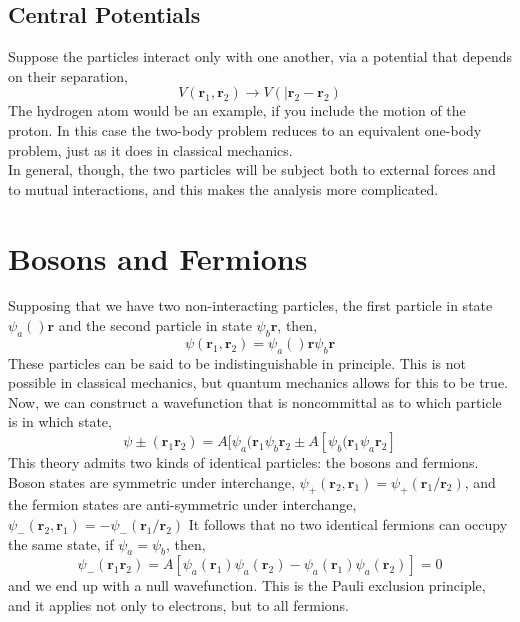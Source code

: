 \subsection{Central Potentials}
Suppose the particles interact only with one another, via a potential that depends on their separation,
\begin{equation}
    V(\textbf{r}_1,\textbf{r}_2)\longrightarrow V(|\textbf{r}_2-\textbf{r}_2)
\end{equation}
The hydrogen atom would be an example, if you include the motion of the proton. In this case the two-body problem reduces to an equivalent one-body problem, just as it does in classical mechanics.\\
In general, though, the two particles will be subject both to external forces and to mutual interactions, and this makes the analysis more complicated.

\section{Bosons and Fermions}
Supposing that we have two non-interacting particles, the first particle in state $\psi_a()\textbf{r}$ and the second particle in state $\psi_b\textbf{r}$, then,
\begin{equation}
    \psi(\textbf{r}_1,\textbf{r}_2)=\psi_a()\textbf{r}\psi_b\textbf{r}
\end{equation}
These particles can be said to be indistinguishable in principle. This is not possible in classical mechanics, but quantum mechanics allows for this to be true.\\
Now, we can construct a wavefunction that is noncommittal as to which particle is in which state,
\begin{equation}
    \psi\pm (\textbf{r}_1\textbf{r}_2)=A[\psi_a(\textbf{r}_1\psi_b\textbf{r}_2\pm A[\psi_b(\textbf{r}_1\psi_a\textbf{r}_2]
\end{equation}
This theory admits two kinds of identical particles: the bosons and fermions. Boson states are symmetric under interchange, $\psi_+(\textbf{r}_2,\textbf{r}_1)=\psi_+(\textbf{r}_1/\textbf{r}_2)$, and the fermion states are anti-symmetric under interchange, $\psi_-(\textbf{r}_2,\textbf{r}_1)=-\psi_-(\textbf{r}_1/\textbf{r}_2)$
It follows that no two identical fermions can occupy the same state, if $\psi_a=\psi_b$, then,
\begin{equation}
    \psi_-(\textbf{r}_1\textbf{r}_2)=A[\psi_a(\textbf{r}_1)\psi_a(\textbf{r}_2)-\psi_a(\textbf{r}_1)\psi_a(\textbf{r}_2)]=0
\end{equation}
and we end up with a null wavefunction. This is the Pauli exclusion principle, and it applies not only to electrons, but to all fermions.
